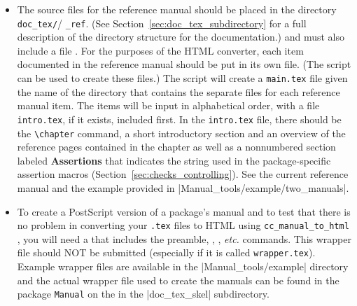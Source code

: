 \begin{itemize}
   \item The source files for the reference manual should be placed in the 
         directory \verb|doc_tex/|/%
         \verb|_ref|.
         (See Section~\ref{sec:doc_tex_subdirectory} for a full description of 
          the directory structure for the documentation.)
         and must also include a file 
         .
         For the purposes of the HTML converter, each item 
         documented in the reference manual should be put in its own file. 
         (The script  can be 
          used to create these files.)
         The script  
         will create a 
                  {{\tt main.tex}}
         file given the name of the directory that contains the separate files 
         for each
         reference manual item.  The items will be input in alphabetical order,
         with a file {\tt intro.tex}, if it 
         exists, included first.  In the
                  {{\tt intro.tex}} file, 
         there should be the \verb|\chapter| command,
         a short introductory section and an overview of the reference pages
         contained in the chapter as well as a nonnumbered section labeled
         \textbf{Assertions} that indicates the string used in the 
         package-specific assertion macros 
         (Section~\ref{sec:checks_controlling}).  See the current reference
         manual and the example provided in
         \nonlinkedpath|Manual_tools/example/two_manuals|. 

   \item To create a PostScript version of a package's manual and to test 
         that there is no problem in converting your {\tt .tex} files to 
         HTML using {\tt cc\_manual\_to\_html}
         , 
         you will need
         a  
         that includes the preamble, \verb||,
         \verb||, {\em etc.} commands.  This wrapper file
         should NOT be submitted (especially if it is called {\tt wrapper.tex}).
         Example wrapper files are available in the 
         \nonlinkedpath|Manual_tools/example| directory and the actual wrapper
         file used to create the manuals can be found in the package 
         \texttt{Manual} on the 
         in the \nonlinkedpath|doc_tex_skel| subdirectory.
\end{itemize}
